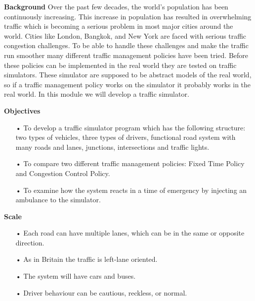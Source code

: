 \documentclass[11pt]{article}
\begin{document}
\textbf{Background}
Over the past few decades, the world's population has been continuously increasing. This increase in population has resulted in overwhelming traffic which is becoming a serious problem in most major cities around the world. Cities like London, Bangkok, and New York are faced with serious traffic congestion challenges. To be able to handle these challenges and make the traffic run smoother many different traffic management policies have been tried. Before these policies can be implemented in the real world they are tested on traffic simulators. These simulator are supposed to be abstract models of the real world, so if a traffic management policy works on the simulator it probably works in the real world. In this module we will develop a traffic simulator.


\textbf{Objectives}
\begin{itemize}
\item[•] To develop a traffic simulator program which has the following structure: two types of vehicles, three types of drivers, functional road system with many roads and lanes, junctions, intersections and traffic lights.
\item[•] To compare two different traffic management policies: Fixed Time Policy and Congestion Control Policy.
\item[•] To examine how the system reacts in a time of emergency by injecting an ambulance to the simulator.
\end{itemize}

\textbf{Scale}
\begin{itemize}
\item[•] Each road can have multiple lanes, which can be in the same or opposite direction.
\item[•] As in Britain the traffic is left-lane oriented.
\item[•] The system will have cars and buses.
\item[•] Driver behaviour can be cautious, reckless, or normal.
\end{itemize}
\end{document}
